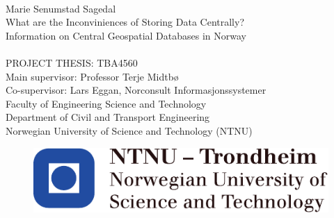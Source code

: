 \thispagestyle{empty}
\mbox{}\\[6pc]

\noindent\Large{Marie Senumstad Sagedal}\\[4pc]
\Huge{What are the Inconviniences of Storing Data Centrally?}\\[1pc]
\Large{Information on Central Geospatial Databases in Norway}\\[5pc]
\\[2pc]
PROJECT THESIS: TBA4560\\
\large{Main supervisor: Professor Terje Midtbø}\\
\large{Co-supervisor: Lars Eggan, Norconsult Informasjonssystemer}\\[2pc]
Faculty of Engineering Science and Technology\\
Department of Civil and Transport Engineering\\
Norwegian University of Science and Technology (NTNU)
\begin{figure}[b!]
   \includegraphics[scale=1.0]{img/NTNU}
\end{figure}

\vfill



